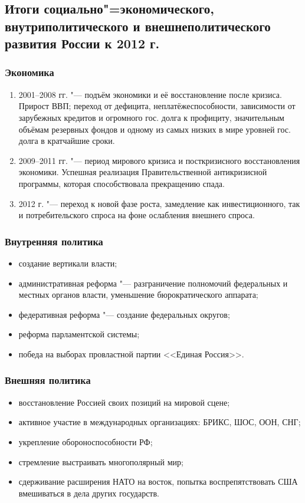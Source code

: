 \subsection{Итоги социально"=экономического, внутриполитического и внешнеполитического развития России к 2012 г.}

\subsubsection{Экономика}

\begin{enumerate}
\item 2001--2008 гг. "--- подъём экономики и её восстановление после кризиса. Прирост ВВП; переход от дефицита, неплатёжеспособности, зависимости от зарубежных кредитов и огромного гос. долга к профициту, значительным объёмам резервных фондов и одному из самых низких в мире уровней гос. долга в кратчайшие сроки.
\item 2009--2011 гг. "--- период мирового кризиса и посткризисного восстановления экономики. Успешная реализация Правительственной антикризисной программы, которая способствовала прекращению спада.
\item 2012 г. "--- переход к новой фазе роста, замедление как инвестиционного, так и потребительского спроса на фоне ослабления внешнего спроса.
\end{enumerate}

\subsubsection{Внутренняя политика}

\begin{itemize}
\item создание вертикали власти;
\item административная реформа "--- разграничение полномочий федеральных и местных органов власти, уменьшение бюрократического аппарата;
\item федеративная реформа "--- создание федеральных округов;
\item реформа парламентской системы;
\item победа на выборах провластной партии <<Единая Россия>>.
\end{itemize}

\subsubsection{Внешняя политика}

\begin{itemize}
\item восстановление Россией своих позиций на мировой сцене;
\item активное участие в международных организациях: БРИКС, ШОС, ООН, СНГ;
\item укрепление обороноспособности РФ;
\item стремление выстраивать многополярный мир;
\item сдерживание расширения НАТО на восток, попытка воспрепятствовать США вмешиваться в дела других государств.
\end{itemize}
